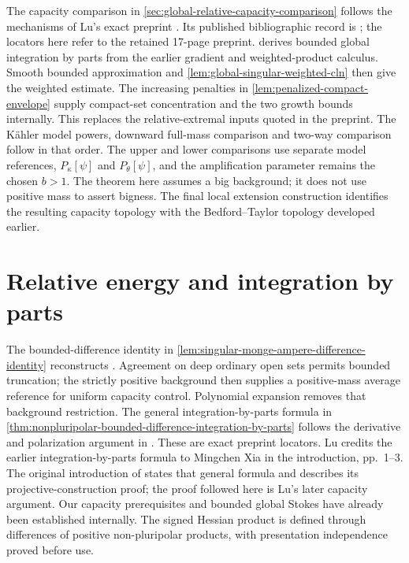 The capacity comparison in \cref{sec:global-relative-capacity-comparison} follows the mechanisms of Lu's exact preprint \cite[Lemmas 3.1--3.4 and Theorem 3.5, pp.~8--13]{Lu2020v1}. Its published bibliographic record is \cite{Lu21}; the locators here refer to the retained 17-page preprint.  derives bounded global integration by parts from the earlier gradient and weighted-product calculus. Smooth bounded approximation and \cref{lem:global-singular-weighted-cln} then give the weighted estimate. The increasing penalties in \cref{lem:penalized-compact-envelope} supply compact-set concentration and the two growth bounds internally. This replaces the relative-extremal inputs quoted in the preprint. The K\"ahler model powers, downward full-mass comparison and two-way comparison follow in that order. The upper and lower comparisons use separate model references, $P_\kappa[\psi]$ and $P_\theta[\psi]$, and the amplification parameter remains the chosen $b>1$. The theorem here assumes a big background; it does not use positive mass to assert bigness. The final local extension construction identifies the resulting capacity topology with the Bedford--Taylor topology developed earlier.

\section{Relative energy and integration by parts}\label{sec:history-energy}
The bounded-difference identity in \cref{lem:singular-monge-ampere-difference-identity} reconstructs \cite[Lemma 4.1, pp.~13--15]{Lu2020v1}. Agreement on deep ordinary open sets permits bounded truncation; the strictly positive background then supplies a positive-mass average reference for uniform capacity control. Polynomial expansion removes that background restriction. The general integration-by-parts formula in \cref{thm:nonpluripolar-bounded-difference-integration-by-parts} follows the derivative and polarization argument in \cite[Proof of Theorem 1.2, pp.~15--16]{Lu2020v1}. These are exact preprint locators. Lu credits the earlier integration-by-parts formula to Mingchen Xia in the introduction, pp.~1--3. The original introduction of \cite[Theorem 1.1 and discussion, pp.~1--2]{Xia2019v1} states that general formula and describes its projective-construction proof; the proof followed here is Lu's later capacity argument. Our capacity prerequisites and bounded global Stokes have already been established internally. The signed Hessian product is defined through differences of positive non-pluripolar products, with presentation independence proved before use.


